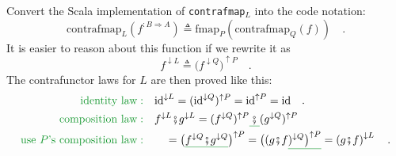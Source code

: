 Convert the Scala implementation of \lstinline!contrafmap!$_{L}$
into the code notation:
\[
\text{contrafmap}_{L}(f^{:B\Rightarrow A})\triangleq\text{fmap}_{P}(\text{contrafmap}_{Q}(f))\quad.
\]
It is easier to reason about this function if we rewrite it as
\[
f^{\downarrow L}\triangleq\big(f^{\downarrow Q}\big)^{\uparrow P}\quad.
\]
The contrafunctor laws for $L$ are then proved like this:
\begin{align*}
{\color{greenunder}\text{identity law}:}\quad & \text{id}^{\downarrow L}=(\text{id}^{\downarrow Q})^{\uparrow P}=\text{id}^{\uparrow P}=\text{id}\quad.\\
{\color{greenunder}\text{composition law}:}\quad & f^{\downarrow L}\bef g^{\downarrow L}=(f^{\downarrow Q})^{\uparrow P}\gunderline{\,\bef\,}(g^{\downarrow Q})^{\uparrow P}\\
{\color{greenunder}\text{use }P\text{'s composition law}:}\quad & \quad=\big(\gunderline{f^{\downarrow Q}\bef g^{\downarrow Q}}\big)^{\uparrow P}=\big((g\bef f\gunderline{)^{\downarrow Q}\big)^{\uparrow P}}=\left(g\bef f\right)^{\downarrow L}\quad.
\end{align*}

